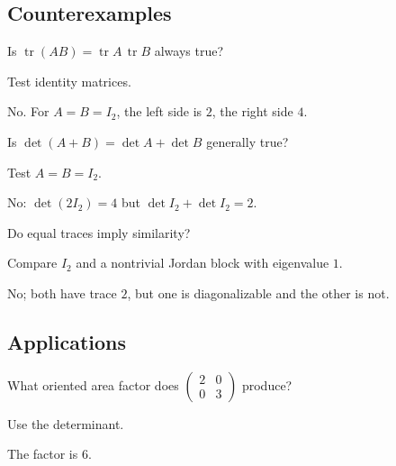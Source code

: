 \subsection*{Counterexamples}

\begin{exercise}\label{exr:i08-expand-10}
Is \(\operatorname{tr}(AB)=\operatorname{tr}A\,\operatorname{tr}B\) always true?
\end{exercise}
\begin{hint}
Test identity matrices.
\end{hint}
\begin{solution}
No. For \(A=B=I_2\), the left side is \(2\), the right side \(4\).
\end{solution}

\begin{exercise}\label{exr:i08-expand-11}
Is \(\det(A+B)=\det A+\det B\) generally true?
\end{exercise}
\begin{hint}
Test \(A=B=I_2\).
\end{hint}
\begin{solution}
No: \(\det(2I_2)=4\) but \(\det I_2+\det I_2=2\).
\end{solution}

\begin{exercise}\label{exr:i08-expand-12}
Do equal traces imply similarity?
\end{exercise}
\begin{hint}
Compare \(I_2\) and a nontrivial Jordan block with eigenvalue \(1\).
\end{hint}
\begin{solution}
No; both have trace \(2\), but one is diagonalizable and the other is not.
\end{solution}

\subsection*{Applications}

\begin{exercise}\label{exr:i08-expand-13}
What oriented area factor does \(\begin{pmatrix}2&0\\0&3\end{pmatrix}\) produce?
\end{exercise}
\begin{hint}
Use the determinant.
\end{hint}
\begin{solution}
The factor is \(6\).
\end{solution}

